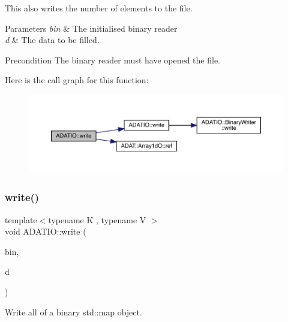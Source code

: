 This also writes the number of elements to the file. 
\begin{DoxyParams}{Parameters}
{\em bin} & The initialised binary reader \\
\hline
{\em d} & The data to be filled.\\
\hline
\end{DoxyParams}
\begin{DoxyPrecond}{Precondition}
The binary reader must have opened the file. 
\end{DoxyPrecond}
Here is the call graph for this function\+:
\nopagebreak
\begin{figure}[H]
\begin{center}
\leavevmode
\includegraphics[width=350pt]{d0/dba/namespaceADATIO_aea9e3ff6a488ce22e363d16085c76a85_cgraph}
\end{center}
\end{figure}
\mbox{\label{namespaceADATIO_acc2655a91a7a0608906b55f7533bde55}} 
\subsubsection{\texorpdfstring{write()}{write()}\hspace{0.1cm}{\footnotesize\ttfamily [24/25]}}
{\footnotesize\ttfamily template$<$typename K , typename V $>$ \\
void A\+D\+A\+T\+I\+O\+::write (\begin{DoxyParamCaption}\item[{\mbox{\hyperlink{classADATIO_1_1BinaryWriter}{Binary\+Writer}} \&}]{bin,  }\item[{const std\+::map$<$ K, V $>$ \&}]{d }\end{DoxyParamCaption})\hspace{0.3cm}{\ttfamily [inline]}}



Write all of a binary std\+::map object. 

